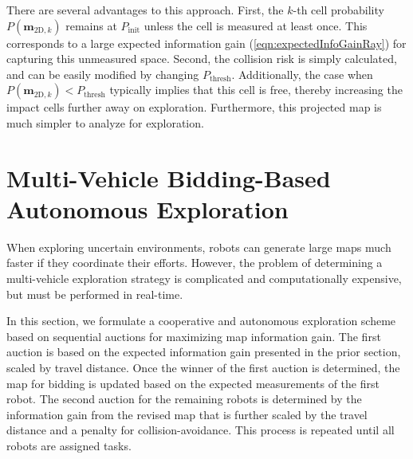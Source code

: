 \documentclass[smallextended]{svjour3}       %
\newcommand{\refeqn}[1]{(\ref{eqn:#1})}
\begin{document}
There are several advantages to this approach. First, the $k$-th cell probability $P(\mathbf{m}_{\text{2D},k})$ remains at $P_\text{init}$ unless the cell is measured at least once. This corresponds to a large expected information gain \refeqn{expectedInfoGainRay} for capturing this unmeasured space. Second, the collision risk is simply calculated, and can be easily modified by changing $P_\text{thresh}$. Additionally, the case when $P(\mathbf{m}_{\text{2D},k})<P_\text{thresh}$ typically implies that this cell is free, thereby increasing the impact cells further away on exploration. Furthermore, this projected map is much simpler to analyze for exploration.


\section{Multi-Vehicle Bidding-Based Autonomous Exploration}
\label{sec:BiddingExploration}

When exploring uncertain environments, robots can generate large maps much faster if they coordinate their efforts. However, the problem of determining a multi-vehicle exploration strategy is complicated and computationally expensive, but must be performed in real-time.

In this section, we formulate a cooperative and autonomous exploration scheme based on sequential auctions for maximizing map information gain. The first auction is based on the expected information gain presented in the prior section, scaled by travel distance. Once the winner of the first auction is determined, the map for bidding is updated based on the expected measurements of the first robot. The second auction for the remaining robots is determined by the information gain from the revised map that is further scaled by the travel distance and a penalty for collision-avoidance. This process is repeated until all robots are assigned tasks. 


\end{document}
